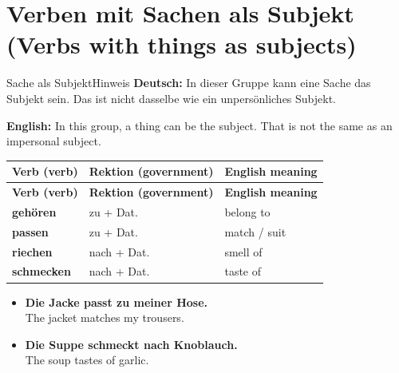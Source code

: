 \documentclass[a4paper,11pt]{article}
\newcommand{\GermanText}[1]{\textbf{Deutsch: }#1\par}
\newcommand{\EnglishText}[1]{{\small\color{SoftGray}\textbf{English: }#1\par}}
\newcommand{\ExampleItem}[2]{\item \textbf{#1}\\{\small\color{SoftGray}#2}}
\begin{document}
\section{Verben mit Sachen als Subjekt (Verbs with things as subjects)}
\begin{grammarentry}{Sache als Subjekt}{Hinweis}
\GermanText{In dieser Gruppe kann eine Sache das Subjekt sein. Das ist nicht dasselbe wie ein unpersönliches Subjekt.}
\EnglishText{In this group, a thing can be the subject. That is not the same as an impersonal subject.}
\end{grammarentry}
\begin{longtable}{>{\raggedright\arraybackslash}p{} >{\raggedright\arraybackslash}p{} >{\raggedright\arraybackslash}p{}}
\rowcolor{HeaderBlueDark}
\color{white}\textbf{Verb (verb)} & \color{white}\textbf{Rektion (government)} & \color{white}\textbf{English meaning}\\
\endfirsthead
\rowcolor{HeaderBlueDark}
\color{white}\textbf{Verb (verb)} & \color{white}\textbf{Rektion (government)} & \color{white}\textbf{English meaning}\\
\endhead
\textbf{gehören} & zu + Dat. & belong to\\
\textbf{passen} & zu + Dat. & match / suit\\
\textbf{riechen} & nach + Dat. & smell of\\
\textbf{schmecken} & nach + Dat. & taste of\\
\end{longtable}
\begin{exbox}
\begin{itemize}
\ExampleItem{Die Jacke passt zu meiner Hose.}{The jacket matches my trousers.}
\ExampleItem{Die Suppe schmeckt nach Knoblauch.}{The soup tastes of garlic.}
\end{itemize}
\end{exbox}
\end{document}
